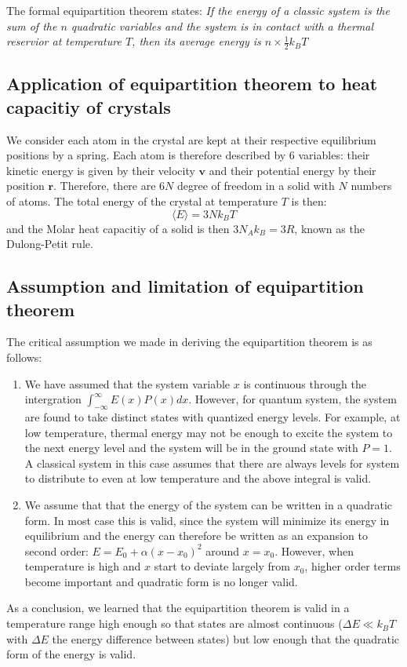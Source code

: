 \documentclass{article}
\begin{document}
The formal equipartition theorem states: \emph{ If the energy of a classic system is the sum
of the $n$ quadratic variables and the system is in contact with a thermal reservior at temperature $T$, 
then its average energy is $n\times \frac{1}{2}k_B T$}

\subsection{Application of equipartition theorem to heat capacitiy of crystals}
We consider each atom in the crystal are kept at their respective equilibrium positions
by a spring. Each atom is therefore described by 6 variables: their kinetic energy
is given by their velocity $\mathbf{v}$ and their potential energy by their 
position $\mathbf{r}$. Therefore, there are $6N$ degree of freedom in a solid 
with $N$ numbers of atoms. The total energy of the crystal at temperature $T$
is then:
\begin{equation}
    \langle E \rangle = 3N k_B T
\end{equation}
and the Molar heat capacitiy of a solid is then $3N_A k_B = 3R$, known as the Dulong-Petit rule.

\subsection{Assumption and limitation of equipartition theorem}
The critical assumption we made in deriving the equipartition theorem is 
as follows:
\begin{enumerate}
    \item We have assumed that the system variable $x$ is continuous through the intergration $\int_{-\infty}^{\infty} E(x) P(x) dx$.
            However, for quantum system, the system are found to take distinct states with quantized energy levels. For example, at low temperature,
            thermal energy may not be enough to excite the system to the next energy level and the system will be in the ground state with $P = 1$.
            A classical system in this case assumes that there are always levels for system to distribute to even at low temperature and the above 
            integral is valid. 
    \item We assume that that the energy of the system can be written in a quadratic form. In most case this is valid, since the system will 
            minimize its energy in equilibrium and the energy can therefore be written as an expansion to second order: $ E = E_0 + \alpha (x - x_0)^2$ 
            around $x =x_0$. However, when temperature is high and $x$ start to deviate largely from $x_0$, 
            higher order terms become important and quadratic form is no longer valid.
\end{enumerate}
As a conclusion, we learned that the equipartition theorem is valid in a temperature range high enough so that states are almost continuous ($\Delta E \ll k_B T$ with
$\Delta E$ the energy difference between states) but 
low enough that the quadratic form of the energy is valid.
\end{document}
